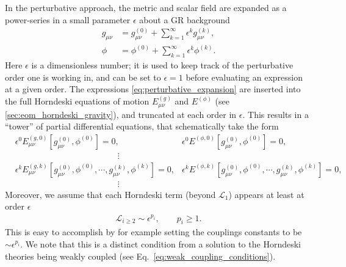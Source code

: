 \documentclass{ws-ijmpd}
\begin{document}
In the perturbative approach,
the metric and scalar field are expanded as a power-series
in a small parameter $\epsilon$ about a GR background
\begin{subequations}
   \label{eq:perturbative_expansion}
   \begin{align}
      g_{\mu\nu}
      &=
      g_{\mu\nu}^{(0)}
      +
      \sum_{k=1}^{\infty}\epsilon^k g^{(k)}_{\mu\nu}
      ,\\
      \phi
      &=
      \phi^{(0)}
      +
      \sum_{k=1}^{\infty}\epsilon^k\phi^{(k)}
      .
   \end{align}
\end{subequations}
Here $\epsilon$ is a dimensionless number; it is used to keep track
of the perturbative order one is working in, and can be set to $\epsilon=1$
before evaluating an expression at a given order.
The expressions \eqref{eq:perturbative_expansion} are inserted
into the full Horndeski equations of motion
$E^{(g)}_{\mu\nu}$ and $E^{(\phi)}$ (see \ref{sec:eom_horndeski_gravity}), 
and truncated at each order in $\epsilon$.
This results in a ``tower'' of partial differential equations, that
schematically take the form
\begin{align}
   \label{eq:perturbatve_tower}
   &\epsilon^0E^{(g,0)}_{\mu\nu}\left[g^{(0)}_{\mu\nu},\phi^{(0)}\right]
   =
   0
   ,
   &\epsilon^0 E^{(\phi,0)}\left[g^{(0)}_{\mu\nu},\phi^{(0)}\right]
   =
   0
   ,\nonumber\\
   &\qquad\qquad\qquad\qquad\qquad\qquad\vdots
   \\
   &\epsilon^kE^{(g,k)}_{\mu\nu}
   \left[
      g^{(0)}_{\mu\nu},\phi^{(0)},
      \cdots,
      g^{(k)}_{\mu\nu},\phi^{(k)}
   \right]
   =
   0
   ,
   &\epsilon^k E^{(\phi,k)}
   \left[
      g^{(0)}_{\mu\nu},\phi^{(0)},
      \cdots,
      g^{(k)}_{\mu\nu},\phi^{(k)}
   \right]
   =
   0
   ,
   \nonumber\\
   &\qquad\qquad\qquad\qquad\qquad\qquad\vdots
\end{align}
Moreover, we assume that each Horndeski term (beyond $\mathcal{L}_1$)
appears at least at order $\epsilon$
\begin{align}
   \label{eq:small_coupling_approx}
   \mathcal{L}_{i\geq2} \sim \epsilon^{p_i}, \qquad p_i\geq1
   .
\end{align}
This is easy to accomplish by
for example setting the couplings constants to be $\sim \epsilon^{p_i}$.
We note that this is a distinct condition from
a solution  to the Horndeski theories being weakly coupled
(see Eq.~\eqref{eq:weak_coupling_conditions}). 
\end{document}
